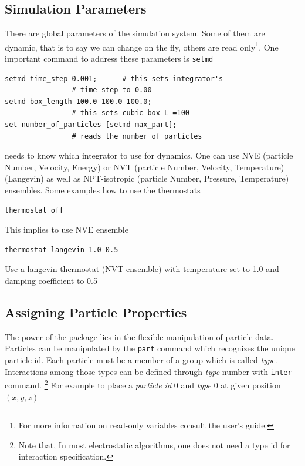 \documentclass[
paper=a4,                       %
fontsize=11pt,                  %
twoside,                        %
footsepline,                    %
headsepline,                    %
headinclude=false,              %
footinclude=false,              %
pagesize,                       %
]{scrartcl}
\begin{document}
 \subsection{Simulation Parameters}
  There are global parameters of the simulation system. Some of them are
  dynamic, that is to say we can change on the fly, others are read only\footnote{For
  more information on read-only variables consult the user's guide.}. One
  important \es{} command to address these parameters is \lstinline|setmd|
  
  {\small\vspace{0,2cm}
\begin{lstlisting}[numbers=none]
setmd time_step 0.001;		# this sets integrator's
				# time step to 0.00
setmd box_length 100.0 100.0 100.0;
				# this sets cubic box L =100
set number_of_particles [setmd max_part];
				# reads the number of particles
\end{lstlisting}\vspace{0,2cm}
} 

\es{} needs to know which integrator to use for dynamics. One can use NVE (particle Number, Velocity, Energy) or NVT (particle Number, Velocity, Temperature)(Langevin) as well as NPT-isotropic (particle Number, Pressure, Temperature) ensembles. Some examples how to use the thermostats

{\small\vspace{0,2cm}
\begin{lstlisting}[numbers=none]
thermostat off
\end{lstlisting}}\vspace{0,2cm}
\noindent This implies to use NVE ensemble
{\small\vspace{0,2cm}
\begin{lstlisting}[numbers=none]
thermostat langevin 1.0 0.5
\end{lstlisting}}\vspace{0,2cm}
\noindent Use a langevin thermostat (NVT ensemble) with temperature set to 1.0 and damping coefficient to 0.5 



\subsection{Assigning Particle Properties}\label{sec:partprop}
The power of the \es{} package lies in the flexible manipulation of particle
data. Particles can be manipulated by the \lstinline|part| command which recognizes the unique particle 
   id. Each particle must be a member of a group which is called \emph{type}. 
Interactions among those types can be defined through \emph{type} number 
   with \lstinline|inter| command.
   \footnote{Note that, In most electrostatic algorithms, one does not need a type id for interaction specification.}
   For example to place a \emph{particle id} 0 and \emph{type} 0 at given 
   position $(x,y,z)$
   
\end{document}
